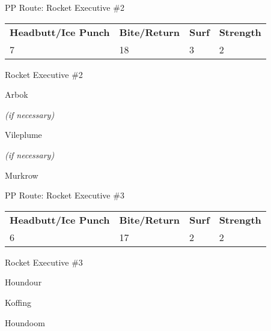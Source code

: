 \begin{paracol}{2}
\switchcolumn*
\begin{misc}{PP Route: Rocket Executive \#2}
	\varwb
	\begin{tabu} to \textwidth {X[6,c] X[5,c] X[4,c] X[4,c]}
		\textbf{Headbutt/Ice Punch} & \textbf{Bite/Return} & \textbf{Surf} & \textbf{Strength}\\ 
		7 & 18 & 3 & 2
	\end{tabu}
	\varwe
\end{misc}

\switchcolumn
\begin{trainer}{Rocket Executive \#2}
	\varwb
	\begin{fightSection}{Arbok}
		\item {} \surf
		\begin{notes}
			\small{\item {} \return{} \textit{(if necessary)}}
		\end{notes}
	\end{fightSection}
	\begin{fightSection}{Vileplume}
		\item {} \icePunch
		\begin{notes}
			\small{\item {} \return{} \textit{(if necessary)}}
		\end{notes}
	\end{fightSection}
	\begin{fightSection}{Murkrow}
		\item {} \return
	\end{fightSection}
	\varwe
\end{trainer}

\switchcolumn*
\begin{misc}{PP Route: Rocket Executive \#3}
	\varwb
	\begin{tabu} to \textwidth {X[6,c] X[5,c] X[4,c] X[4,c]}
		\textbf{Headbutt/Ice Punch} & \textbf{Bite/Return} & \textbf{Surf} & \textbf{Strength}\\ 
		6 & 17 & 2 & 2
	\end{tabu}
	\varwe
\end{misc}

\switchcolumn
\begin{trainer}{Rocket Executive \#3}
	\varwb
	\begin{fightSection}{Houndour}
		\item {} \return
	\end{fightSection}
	\begin{fightSection}{Koffing}
		\item {} \icePunch
	\end{fightSection}
	\begin{fightSection}{Houndoom}
		\item {} \surf
	\end{fightSection}
	\varwe
\end{trainer}


\end{paracol}
